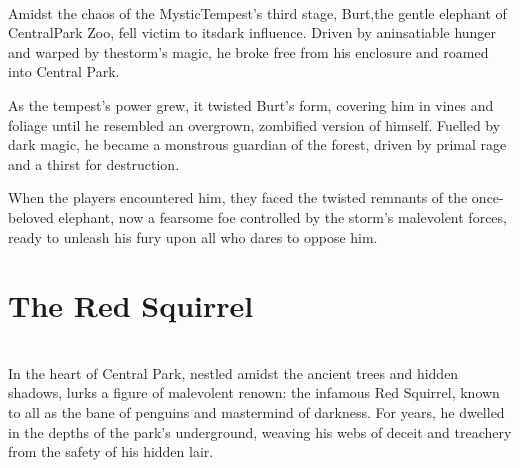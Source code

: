 \vfill\eject
\vspace*{2.75cm}\hfill\\
\hspace*{4cm}Amidst the chaos of the Mystic\linebreak\hspace*{4.5cm}Tempest's third stage, Burt,\linebreak\hspace*{4.5cm}the gentle elephant of Central\linebreak\hspace*{4.5cm}Park Zoo, fell victim to its\linebreak\hspace*{4.5cm}dark influence. Driven by an\linebreak\hspace*{3.5cm}insatiable hunger and warped by the\linebreak\hspace*{2cm}storm's magic, he broke free from his enclosure and roamed into Central Park.

As the tempest's power grew, it twisted Burt's form, covering him in vines and foliage until he resembled an overgrown, zombified version of himself. Fuelled by dark magic, he became a monstrous guardian of the forest, driven by primal rage and a thirst for destruction.

When the players encountered him, they faced the twisted remnants of the once-beloved elephant, now a fearsome foe controlled by the storm's malevolent forces, ready to unleash his fury upon all who dares to oppose him.

\DungeonSheetGeometry
\section*{The Red Squirrel}
\label{sec:RedSquirrel}\hfill\\
In the heart of Central Park, nestled amidst the ancient trees and hidden shadows, lurks a figure of malevolent renown: the infamous Red Squirrel, known to all as the bane of penguins and mastermind of darkness. For years, he dwelled in the depths of the park's underground, weaving his webs of deceit and treachery from the safety of his hidden lair.

